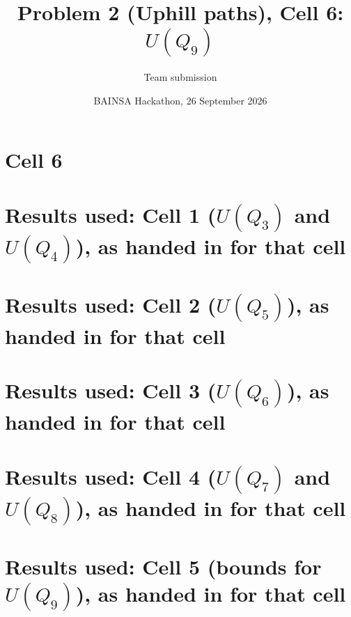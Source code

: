 
\title{Problem 2 (Uphill paths), Cell 6: $U(Q_9)$}
\author{Team submission}
\date{BAINSA Hackathon, 26 September 2026}
\maketitle
\section{Cell 6}

\appendix
\section{Results used: Cell 1 ($U(Q_3)$ and $U(Q_4)$), as handed in for that cell}

\section{Results used: Cell 2 ($U(Q_5)$), as handed in for that cell}

\section{Results used: Cell 3 ($U(Q_6)$), as handed in for that cell}

\section{Results used: Cell 4 ($U(Q_7)$ and $U(Q_8)$), as handed in for that cell}

\section{Results used: Cell 5 (bounds for $U(Q_9)$), as handed in for that cell}


